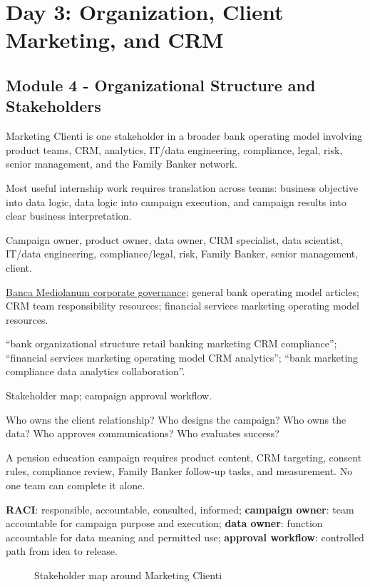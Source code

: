 \documentclass[
	11pt,
	fleqn,
	a4paper,
	oneside,
]{LegrandOrangeBook}
\newcommand{\moduleblock}[9]{%
	\begin{description}[leftmargin=3.4cm, style=nextline, font=\sffamily\bfseries]
		\item[What it is] #1
		\item[Why it matters] #2
		\item[Key concepts] #3
		\item[Resources to find] #4
		\item[Search queries] #5
		\item[Diagrams] #6
		\item[Practical questions] #7
		\item[Mini case] #8
		\item[Key terms] #9
	\end{description}
}
\newcommand{\source}[2]{\href{#2}{#1}}
\newcommand{\term}[2]{\textbf{#1}: #2}
\begin{document}
\chapter{Day 3: Organization, Client Marketing, and CRM}

\section{Module 4 - Organizational Structure and Stakeholders}

\moduleblock
{Marketing Clienti is one stakeholder in a broader bank operating model involving product teams, CRM, analytics, IT/data engineering, compliance, legal, risk, senior management, and the Family Banker network.}
{Most useful internship work requires translation across teams: business objective into data logic, data logic into campaign execution, and campaign results into clear business interpretation.}
{Campaign owner, product owner, data owner, CRM specialist, data scientist, IT/data engineering, compliance/legal, risk, Family Banker, senior management, client.}
{\source{Banca Mediolanum corporate governance}{https://www.bancamediolanum.it/corporate/investors?lang=en}; general bank operating model articles; CRM team responsibility resources; financial services marketing operating model resources.}
{``bank organizational structure retail banking marketing CRM compliance''; ``financial services marketing operating model CRM analytics''; ``bank marketing compliance data analytics collaboration''.}
{Stakeholder map; campaign approval workflow.}
{Who owns the client relationship? Who designs the campaign? Who owns the data? Who approves communications? Who evaluates success?}
{A pension education campaign requires product content, CRM targeting, consent rules, compliance review, Family Banker follow-up tasks, and measurement. No one team can complete it alone.}
{\term{RACI}{responsible, accountable, consulted, informed}; \term{campaign owner}{team accountable for campaign purpose and execution}; \term{data owner}{function accountable for data meaning and permitted use}; \term{approval workflow}{controlled path from idea to release}.}

\begin{figure}[H]
	\centering
	\caption{Stakeholder map around Marketing Clienti}
\end{figure}
\end{document}
